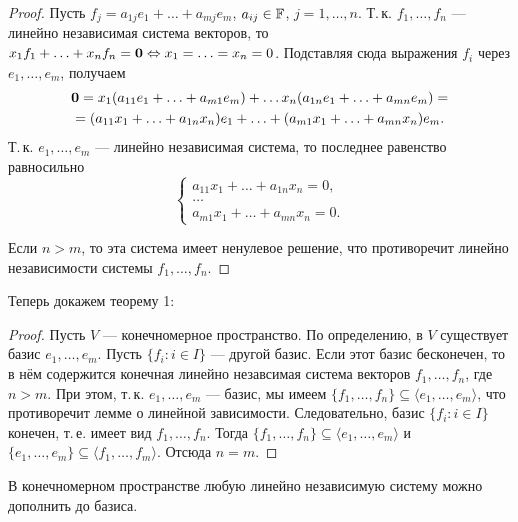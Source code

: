 \begin{proof}
    Пусть $f_j = a_{1j}e_1 + \ldots + a_{mj}e_m$, $a_{ij} \in \mathbb{F}$, $j = 1, \ldots, n$. Т.\,к. $f_1, \ldots, f_n$ --- линейно независимая система векторов, то $x_1f_1 + \ldots + x_nf_n = \boldsymbol{0} \Leftrightarrow x_1 = \ldots = x_n = 0$. Подставляя сюда выражения $f_i$ через $e_1, \ldots, e_m$, получаем
    \begin{multline*}
        \boldsymbol{0} = x_1(a_{11}e_1 + \ldots + a_{m1}e_m) + \ldots x_n(a_{1n}e_1 + \ldots + a_{mn}e_m) =\\ = (a_{11}x_1 + \ldots + a_{1n}x_n)e_1 + \ldots + (a_{m1}x_1 + \ldots + a_{mn}x_n)e_m.
    \end{multline*}
    Т.\,к. $e_1, \ldots, e_m$ --- линейно независимая система, то последнее равенство равносильно
    \[
        \begin{cases}
            a_{11}x_1 + \ldots + a_{1n}x_n = 0,\\
            \ldots\\
            a_{m1}x_1 + \ldots + a_{mn}x_n = 0.
        \end{cases}
    \]

    Если $n > m$, то эта система имеет ненулевое решение, что противоречит линейно независимости системы $f_1, \ldots, f_n$.
\end{proof}

Теперь докажем теорему 1:

\begin{proof}
    Пусть $V$ --- конечномерное пространство. По определению, в $V$ существует базис $e_1, \ldots, e_m$. Пусть $\{f_i : i \in I\}$ --- другой базис. Если этот базис бесконечен, то в нём содержится конечная линейно незавсимая система векторов $f_1, \ldots, f_n$, где $n > m$. При этом, т.\,к. $e_1, \ldots, e_m$ --- базис, мы имеем $\{f_1, \ldots, f_n\} \subseteq \langle e_1, \ldots, e_m\rangle$, что противоречит лемме о линейной зависимости. Следовательно, базис $\{f_i : i \in I\}$ конечен, т.\,е. имеет вид $f_1, \ldots, f_n$. Тогда $\{f_1, \ldots, f_n\} \subseteq \langle e_1, \ldots, e_m \rangle$ и $\{e_1, \ldots, e_m\} \subseteq \langle f_1, \ldots, f_m\rangle$. Отсюда $n = m$.
\end{proof}

\begin{lemma}
    В конечномерном пространстве любую линейно независимую систему можно дополнить до базиса.
\end{lemma}

